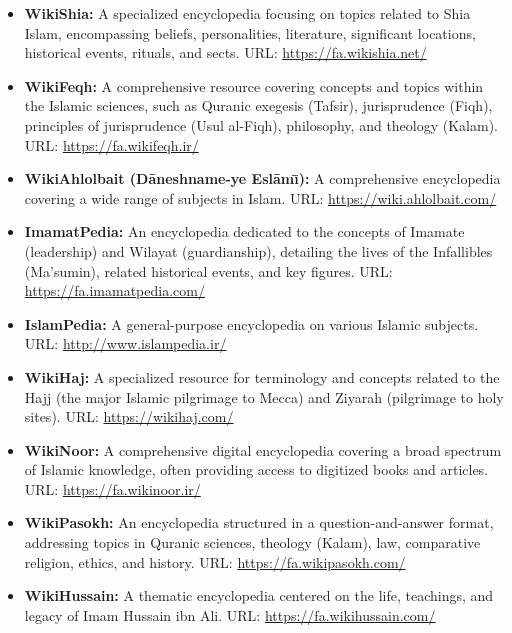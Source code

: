 \documentclass[11pt]{article}
\begin{document}
\begin{itemize}
    \item \textbf{WikiShia:} A specialized encyclopedia focusing on topics related to Shia Islam, encompassing beliefs, personalities, literature, significant locations, historical events, rituals, and sects. URL: \url{https://fa.wikishia.net/}
    
    \item \textbf{WikiFeqh:} A comprehensive resource covering concepts and topics within the Islamic sciences, such as Quranic exegesis (Tafsir), jurisprudence (Fiqh), principles of jurisprudence (Usul al-Fiqh), philosophy, and theology (Kalam). URL: \url{https://fa.wikifeqh.ir/}
    
    \item \textbf{WikiAhlolbait (D\={a}neshname-ye Esl\={a}m\={\i}):} A comprehensive encyclopedia covering a wide range of subjects in Islam. URL: \url{https://wiki.ahlolbait.com/}
    
    \item \textbf{ImamatPedia:} An encyclopedia dedicated to the concepts of Imamate (leadership) and Wilayat (guardianship), detailing the lives of the Infallibles (Ma'sumin), related historical events, and key figures. URL: \url{https://fa.imamatpedia.com/}
    
    \item \textbf{IslamPedia:} A general-purpose encyclopedia on various Islamic subjects. URL: \url{http://www.islampedia.ir/}
    
    \item \textbf{WikiHaj:} A specialized resource for terminology and concepts related to the Hajj (the major Islamic pilgrimage to Mecca) and Ziyarah (pilgrimage to holy sites). URL: \url{https://wikihaj.com/}
    
    \item \textbf{WikiNoor:} A comprehensive digital encyclopedia covering a broad spectrum of Islamic knowledge, often providing access to digitized books and articles. URL: \url{https://fa.wikinoor.ir/}
    
    \item \textbf{WikiPasokh:} An encyclopedia structured in a question-and-answer format, addressing topics in Quranic sciences, theology (Kalam), law, comparative religion, ethics, and history. URL: \url{https://fa.wikipasokh.com/}
    
    \item \textbf{WikiHussain:} A thematic encyclopedia centered on the life, teachings, and legacy of Imam Hussain ibn Ali. URL: \url{https://fa.wikihussain.com/}
    

\end{itemize}
\end{document}
